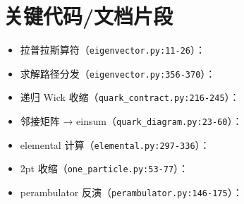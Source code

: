 \documentclass[UTF8]{ctexart}
\begin{document}
\section{关键代码/文档片段}
\begin{itemize}
\item 拉普拉斯算符（\texttt{eigenvector.py:11-26}）：
\end{itemize}

\begin{itemize}
\item 求解路径分发（\texttt{eigenvector.py:356-370}）：
\end{itemize}

\begin{itemize}
\item 递归 Wick 收缩（\texttt{quark\_contract.py:216-245}）：
\end{itemize}

\begin{itemize}
\item 邻接矩阵 → einsum（\texttt{quark\_diagram.py:23-60}）：
\end{itemize}

\begin{itemize}
\item elemental 计算（\texttt{elemental.py:297-336}）：
\end{itemize}

\begin{itemize}
\item 2pt 收缩（\texttt{one\_particle.py:53-77}）：
\end{itemize}

\begin{itemize}
\item perambulator 反演（\texttt{perambulator.py:146-175}）：
\end{itemize}

\end{document}
